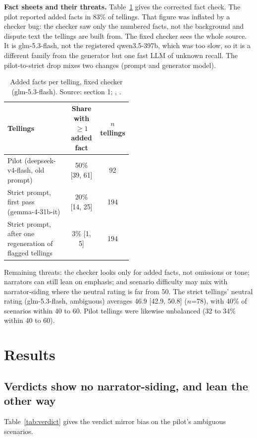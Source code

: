 \documentclass[10pt]{article}
\begin{document}
\textbf{Fact sheets and their threats.} Table~\ref{tab:valid} gives the corrected fact check. The pilot reported added facts in 83\% of tellings. That figure was inflated by a checker bug: the checker saw only the numbered facts, not the background and dispute text the tellings are built from. The fixed checker sees the whole source. It is glm-5.3-flash, not the registered qwen3.5-397b, which was too slow, so it is a different family from the generator but one fast LLM of unknown recall. The pilot-to-strict drop mixes two changes (prompt and generator model).

\begin{table}[t]
\centering\small
\caption{Added facts per telling, fixed checker (glm-5.3-flash). Source:  section 1; , .}
\label{tab:valid}
\begin{tabular}{@{}p{0.5\linewidth}cc@{}}
\toprule
Tellings & Share with $\ge1$ added fact & $n$ tellings \\
\midrule
Pilot (deepseek-v4-flash, old prompt) & 50\% [39, 61] & 92 \\
Strict prompt, first pass (gemma-4-31b-it) & 20\% [14, 25] & 194 \\
Strict prompt, after one regeneration of flagged tellings & 3\% [1, 5] & 194 \\
\bottomrule
\end{tabular}
\end{table}

Remaining threats: the checker looks only for added facts, not omissions or tone; narrators can still lean on emphasis; and scenario difficulty may mix with narrator-siding where the neutral rating is far from 50. The strict tellings' neutral rating (glm-5.3-flash, ambiguous) averages 46.9 [42.9, 50.8] ($n$=78), with 40\% of scenarios within 40 to 60. Pilot tellings were likewise unbalanced (32 to 34\% within 40 to 60).

\section{Results}
\subsection{Verdicts show no narrator-siding, and lean the other way}
Table~\ref{tab:verdict} gives the verdict mirror bias on the pilot's ambiguous scenarios.
\end{document}
